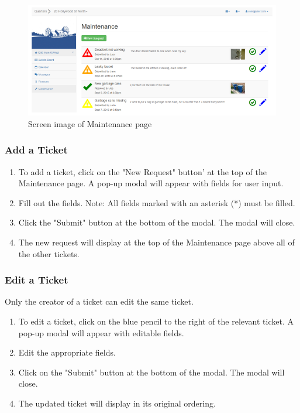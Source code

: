 \documentclass[12pt]{article}
\begin{document}
    \begin{figure}
        \centering
        \includegraphics[width=\textwidth]{maintenance}
        \caption{Screen image of Maintenance page}
        \label{fig:maintenance}
    \end{figure}
    
    \subsubsection{Add a Ticket}
    \begin{enumerate}
        \item To add a ticket, click on the "New Request" button' at the top of the Maintenance page. A pop-up modal will appear with fields for user input.
        \item Fill out the fields. Note: All fields marked with an asterisk (*) must be filled.
        \item Click the "Submit" button at the bottom of the modal. The modal will close.
        \item The new request will display at the top of the Maintenance page above all of the other tickets.
    \end{enumerate}
    
    \subsubsection{Edit a Ticket}
    Only the creator of a ticket can edit the same ticket.
    \begin{enumerate}
        \item To edit a ticket, click on the blue pencil to the right of the relevant ticket. A pop-up modal will appear with editable fields.
        \item Edit the appropriate fields.
        \item Click on the "Submit" button at the bottom of the modal. The modal will close.
        \item The updated ticket will display in its original ordering.
    \end{enumerate}
    
\end{document}
